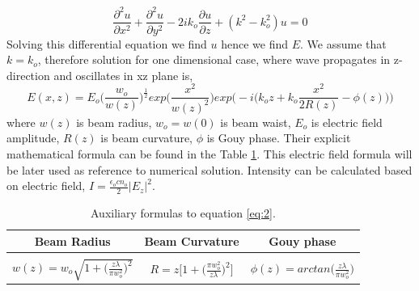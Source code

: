 \documentclass[a4paper]{article}
\begin{document}
	\begin{equation}\label{eq:1}
	\frac{\partial^2 u}{\partial x^2}+ \frac{\partial^2 u}{\partial y^2} - 2ik_o\frac{\partial u}{\partial z}+(k^2-k_o^2)u=0
	\end{equation}
	Solving this differential equation we find $u$ hence we find $E$. We assume that $k = k_o$, therefore solution for one dimensional case, where wave propagates in z-direction and oscillates in xz plane is,
	\begin{equation}\label{eq:2}
	E(x,z)=E_o\bigg(\frac{w_o}{w(z)}\bigg)^{\frac{1}{2}}exp\bigg(\frac{x^2}{w(z)^2}\bigg)exp\bigg(-i\Big(k_oz+k_o\frac{x^2}{2R(z)}-\phi(z)\Big)\bigg)
	\end{equation}
	where $w(z)$ is beam radius, $w_o = w(0)$ is beam waist, $E_o$ is electric field amplitude, $R(z)$ is beam curvature, $\phi$ is Gouy phase. Their explicit mathematical formula can be found in the Table \ref{tab:Table1}. This electric field formula will be later used as reference to numerical solution.
	Intensity can be calculated based on electric field, $I = \frac{\epsilon _o c n_o}{2}|E_z|^2$.
	

	\begin{table}[h!]
		\begin{center}
			\begin{tabular}{c| c| c} %
				\textbf{Beam Radius} & \textbf{Beam Curvature} & \textbf{Gouy phase}\\
				\hline
				&&\\
				$w(z)= w_o\sqrt{1+\Big(\frac{z\lambda}{\pi w_o^2}\Big)^2}$ & $R=z\bigg[1+\Big(\frac{\pi w_o^2}{z\lambda}\Big)^2\bigg]$ & $\phi(z)=arctan\Big(\frac{z\lambda}{\pi w_o^2}\Big)$\\
			\end{tabular}
			\caption{\label{tab:Table1} Auxiliary formulas to equation \ref{eq:2}.}
		\end{center}
	\end{table}
	
\end{document}
